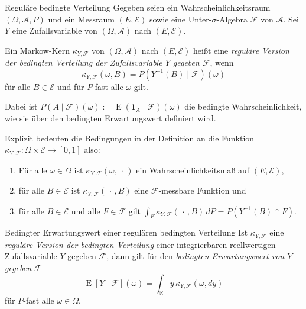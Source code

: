 \begin{defi}{Reguläre bedingte Verteilung}
    Gegeben seien ein Wahrscheinlichkeitsraum $(\Omega ,{\mathcal{A}},P)$ und ein Messraum $(E,{\mathcal{E}})$ sowie eine Unter-$\sigma$-Algebra $\mathcal{F}$ von $\mathcal{A}$.
    Sei $Y$ eine Zufallsvariable von $(\Omega ,{\mathcal{A}})$ nach $(E,{\mathcal{E}})$.

    Ein Markow-Kern $\kappa_{Y,{\mathcal{F}}}$ von $(\Omega ,{\mathcal{A}})$ nach $(E,{\mathcal{E}})$ heißt eine \emph{reguläre Version der bedingten Verteilung der Zufallsvariable $Y$ gegeben $\mathcal{F}$}, wenn
    \[
        \kappa_{Y,{\mathcal{F}}}(\omega ,B)=P(Y^{-1}(B)\mid{\mathcal{F}})(\omega )
    \]
    für alle $B \in{\mathcal{E}}$ und für $P$-fast alle $\omega$ gilt.

    Dabei ist $P(A\mid{\mathcal{F}})(\omega ):=\operatorname{E} (\mathbf{1}_{A}\mid{\mathcal{F}})(\omega )$ die bedingte Wahrscheinlichkeit, wie sie über den bedingten Erwartungswert definiert wird.

    Explizit bedeuten die Bedingungen in der Definition an die Funktion $\kappa_{Y,{\mathcal{F}}}: \Omega \times{\mathcal{E}}\to [0,1]$ also:
    \begin{enumerate}
        \item Für alle $\omega \in \Omega$ ist $\kappa_{Y,{\mathcal{F}}}(\omega ,\,\cdot \,)$ ein Wahrscheinlichkeitsmaß auf $(E,{\mathcal{E}})$,
        \item für alle $B\in{\mathcal{E}}$ ist $\kappa_{Y,{\mathcal{F}}}(\,\cdot \,,B)$ eine $\mathcal{F}$-messbare Funktion und
        \item für alle $B\in{\mathcal{E}}$ und alle $F\in{\mathcal{F}}$ gilt $\int_{F}\kappa_{Y,{\mathcal{F}}}(\,\cdot \,,B)\,dP=P(Y^{-1}(B)\cap F)$.
    \end{enumerate}
\end{defi}

\begin{defi}{Bedingter Erwartungswert einer regulären bedingten Verteilung}
    Ist $\kappa_{Y,{\mathcal{F}}}$ eine \emph{reguläre Version der bedingten Verteilung} einer integrierbaren reellwertigen Zufallsvariable $Y$ gegeben $\mathcal{F}$, dann gilt für den \emph{bedingten Erwartungswert von $Y$ gegeben $\mathcal{F}$}
    \[
        \operatorname{E} [Y\mid{\mathcal{F}}](\omega )=\int_{\mathbb{R}} y\,\kappa_{Y,{\mathcal{F}}}(\omega ,dy)
    \]
    für $P$-fast alle $\omega \in \Omega$.
\end{defi}

